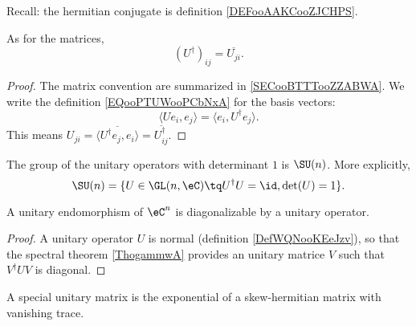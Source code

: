Recall: the hermitian conjugate is definition \ref{DEFooAAKCooZJCHPS}.
\begin{lemma}
	As for the matrices,
	\begin{equation}
		(U^{\dag})_{ij}=\overline{ U_{ji} }.
	\end{equation}
\end{lemma}

\begin{proof}
	The matrix convention are summarized in \ref{SECooBTTTooZZABWA}. We write the definition \eqref{EQooPTUWooPCbNxA} for the basis vectors:
	\begin{equation}
		\langle Ue_i, e_j\rangle =\langle e_i, U^{\dag}e_j\rangle .
	\end{equation}
	This means \( U_{ji}=\overline{ \langle U^{\dag}e_j, e_i\rangle  }=\overline{ U^{\dag}_{ij} }\).
\end{proof}

\begin{definition}        \label{DEFooVIQUooQbnYMu}
	The group of the unitary operators with determinant \( 1\) is \( \SU(n)\). More explicitly,
	\begin{equation}
		\SU(n)=\{U\in \GL(n,\eC)\tq U^{\dag}U=\id,\det(U)=1\}.
	\end{equation}
\end{definition}

\begin{proposition}     \label{PROPooYXPRooBgikdE}
	A unitary endomorphism of \( \eC^n\) is diagonalizable by a unitary operator.
\end{proposition}

\begin{proof}
	A unitary operator \( U\) is normal (definition \ref{DefWQNooKEeJzv}), so that the spectral theorem \ref{ThogammwA} provides an unitary matrice \( V\) such that \( V^{\dag}UV\) is diagonal.
\end{proof}

\begin{proposition}     \label{PROPooZBJSooEIguXR}
	A special unitary matrix is the exponential of a skew-hermitian matrix with vanishing trace.
\end{proposition}

